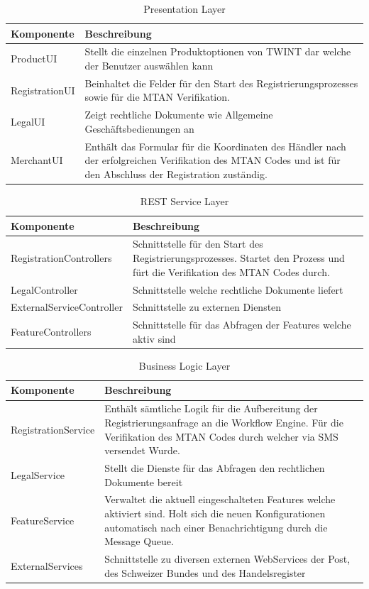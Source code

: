 \begin{table}[H]
	\centering
	\caption{Presentation Layer}
	\begin{tabular}{ | p{4cm} | p{11cm} | }
		\toprule
		{\textbf{Komponente}} & {\textbf{Beschreibung}} \\
		\midrule
		ProductUI &  Stellt die einzelnen Produktoptionen von TWINT dar welche der Benutzer auswählen kann\\ \hline
		RegistrationUI  &  Beinhaltet die Felder für den Start des Registrierungsprozesses sowie für die MTAN Verifikation.\\ \hline
		LegalUI &  Zeigt rechtliche Dokumente wie Allgemeine Geschäftsbedienungen an \\ \hline
		MerchantUI & Enthält das Formular für die Koordinaten des Händler nach der erfolgreichen Verifikation des MTAN Codes und ist für den Abschluss der Registration zuständig.\\
		\bottomrule
	\end{tabular}
\end{table}

\begin{table}[H]
	\centering
	\caption{REST Service Layer}
	\begin{tabular}{ | p{4cm} | p{11cm} | }
		\toprule
		{\textbf{Komponente}} & {\textbf{Beschreibung}} \\
		\midrule
		RegistrationControllers &  Schnittstelle für den Start des Registrierungsprozesses. Startet den Prozess und fürt die Verifikation des MTAN Codes durch.\\ \hline
		LegalController &  Schnittstelle welche rechtliche Dokumente liefert \\ \hline
		ExternalServiceController &  Schnittstelle zu externen Diensten \\ \hline
		FeatureControllers & Schnittstelle für das Abfragen der Features welche aktiv sind \\
		\bottomrule
	\end{tabular}
\end{table}

\begin{table}[H]
	\centering
	\caption{Business Logic Layer}
	\begin{tabular}{ | p{4cm} | p{11cm} | }
		\toprule
		{\textbf{Komponente}} & {\textbf{Beschreibung}} \\
		\midrule
		RegistrationService &  Enthält sämtliche Logik für die Aufbereitung der Registrierungsanfrage an die Workflow Engine. Für die Verifikation des MTAN Codes durch welcher via SMS versendet Wurde.\\ \hline
		LegalService &  Stellt die Dienste für das Abfragen den rechtlichen Dokumente bereit \\ \hline
		FeatureService &  Verwaltet die aktuell eingeschalteten Features welche aktiviert sind. Holt sich die neuen Konfigurationen automatisch nach einer Benachrichtigung durch die Message Queue. \\ \hline
		ExternalServices & Schnittstelle zu diversen externen WebServices der Post, des Schweizer Bundes und des Handelsregister \\
		\bottomrule
	\end{tabular}
\end{table}

